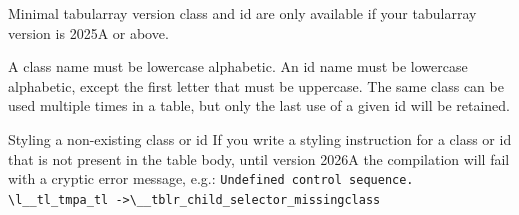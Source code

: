 \begin{warningbox}{Minimal tabularray version}
	class and id are only available if your tabularray version is 2025A or above.
\end{warningbox}


A class name must be lowercase alphabetic. An id name must be lowercase alphabetic, except the first letter that must be uppercase. The same class can be used multiple times in a table, but only the last use of a given id will be retained.

\begin{errorbox}{Styling a non-existing class or id}
	If you write a styling instruction for a class or id that is not present in the table body, until version 2026A the compilation will fail with a cryptic error message, e.g.: \texttt{Undefined control sequence. \textbackslash l\_\_tl\_tmpa\_tl ->\textbackslash \_\_tblr\_child\_selector\_missingclass}
\end{errorbox}